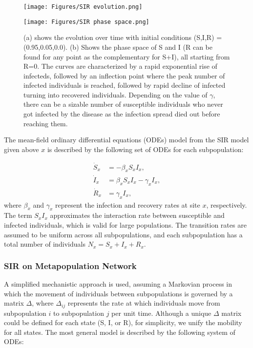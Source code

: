 \begin{figure}[ht]
    \centering
    \begin{minipage}{0.45\textwidth}
        \centering
        \texttt{[image: Figures/SIR evolution.png]}
        \subcaption{}
    \end{minipage}
    \begin{minipage}{0.45\textwidth}
        \centering
        \texttt{[image: Figures/SIR phase space.png]}
        \subcaption{}
    \end{minipage}
    \hfill
    \caption{\small (a) shows the evolution over time with initial conditions (S,I,R) = (0.95,0.05,0.0). (b) Shows the phase space of S and I (R can be found for any point as the complementary for S+I), all starting from R=0. The curves are characterized by a rapid exponential rise of infecteds, followed by an inflection point where the peak number of infected individuals is reached, followed by rapid decline of infected turning into recovered individuals. Depending on the value of $\gamma$, there can be a sizable number of susceptible individuals who never got infected by the disease as the infection spread died out before reaching them.}
    \label{fig:SIR_comparison}
\end{figure}
The mean-field ordinary differential equations (ODEs) model from the SIR model given above  $x$ is described by the following set of ODEs for each subpopulation:

\begin{equation}
\begin{aligned}
    \dot{S}_{x} &= -\beta_{x} S_{x} I_{x}, \\
    \dot{I}_{x} &= \beta_{x} S_{x} I_{x} - \gamma_{x} I_{x}, \\
    \dot{R}_{x} &= \gamma_{x} I_{x},
\end{aligned}
\end{equation}
where $ \beta_x$ and $ \gamma_x$ represent the infection and recovery rates at site $ x$, respectively.\\
The term $S_x I_x$ approximates the interaction rate between susceptible and infected individuals, which is valid for large populations. The transition rates are assumed to be uniform across all subpopulations, and each subpopulation has a total number of individuals $ N_x = S_x + I_x + R_x$.\\


\subsubsection{SIR on Metapopulation Network}
A simplified mechanistic approach is used, assuming a Markovian process in which the movement of individuals between subpopulations is governed by a matrix $\Delta$, where $\Delta_{ij}$ represents the rate at which individuals move from subpopulation $i$ to subpopulation $j$ per unit time. Although a unique $\Delta$ matrix could be defined for each state (S, I, or R), for simplicity, we unify the mobility for all states. The most general model is described by the following system of ODEs:

